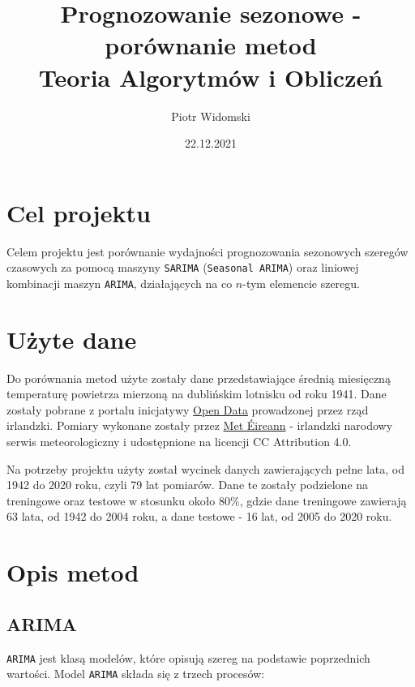 \documentclass[12pt]{article}
\title{Prognozowanie sezonowe - porównanie metod \\
    \large Teoria Algorytmów i Obliczeń \\}
\author{Piotr Widomski}
\date{22.12.2021}
\begin{document}
\maketitle

\section{Cel projektu}

Celem projektu jest porównanie wydajności prognozowania sezonowych szeregów czasowych za pomocą maszyny \texttt{SARIMA} (\texttt{Seasonal ARIMA}) oraz liniowej kombinacji maszyn \texttt{ARIMA}, działających na co $n$-tym elemencie szeregu.

\section{Użyte dane}

Do porównania metod użyte zostały dane przedstawiające średnią miesięczną temperaturę powietrza mierzoną na dublińskim lotnisku od roku 1941. Dane zostały pobrane z portalu inicjatywy \href{https://data.gov.ie/dataset/dublin-airport-monthly-data?package_type=dataset}{Open Data} prowadzonej przez rząd irlandzki. Pomiary wykonane zostały przez \href{https://www.met.ie/}{Met Éireann} - irlandzki narodowy serwis meteorologiczny i udostępnione na licencji CC Attribution 4.0.

Na potrzeby projektu użyty został wycinek danych zawierających pełne lata, od 1942 do 2020 roku, czyli 79 lat pomiarów. Dane te zostały podzielone na treningowe oraz testowe w stosunku około $80\%$, gdzie dane treningowe zawierają 63 lata, od 1942 do 2004 roku, a dane testowe - 16 lat, od 2005 do 2020 roku.

\section{Opis metod}

\subsection{ARIMA}

\texttt{ARIMA} jest klasą modelów, które opisują szereg na podstawie poprzednich wartości. Model \texttt{ARIMA} składa się z trzech procesów:
\end{document}

